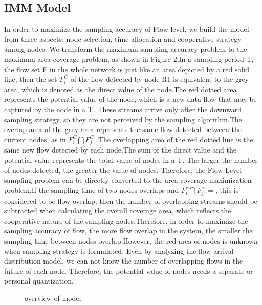 \documentclass[conference,compsoc]{IEEEtran}
\begin{document}
\subsection{IMM  Model}
In order to maximize the sampling accuracy of Flow-level, we build the model from three aspects: node selection, time allocation and cooperative strategy among nodes. We transform the maximum sampling accuracy problem to the maximum area coverage problem, as shown in Figure 2.In a sampling period T, the flow set F in the whole network is just like an area depicted by a red solid line, then the set $F_i^ C$ of the flow detected by node R1 is equivalent to the grey area, which is denoted as the direct value of the node.The red dotted area represents the potential value of the node, which is a new data flow that may be captured by the node in a T. These streams arrive only after the downward sampling strategy, so they are not perceived by the sampling algorithm.The overlap area of the grey area represents the same flow detected between the current nodes, as in $F_i ^ C \bigcap F_j ^ C$. The overlapping area of the red dotted line is the same new flow detected by each node.The sum of the direct value and the potential value represents the total value of nodes in a T. The larger the number of nodes detected, the greater the value of nodes. Therefore, the Flow-Level sampling problem can be directly converted to the area coverage maximization problem.If the sampling time of two nodes overlaps and $F^c_i \bigcap F^c_j!={}$, this is considered to be flow overlap, then the number of overlapping streams should be subtracted when calculating the overall coverage area, which reflects the cooperative nature of the sampling nodes.Therefore, in order to maximize the sampling accuracy of flow, the more flow overlap in the system, the smaller the sampling time between nodes overlap.However, the red area of nodes is unknown when sampling strategy is formulated. Even by analyzing the flow arrival distribution model, we can not know the number of overlapping flows in the future of each node. Therefore, the potential value of nodes needs a separate or personal quantization.
\begin{figure}[!!!!!!!!!!!!!!hhhhhhhhhht]
\centering
{}
\caption{overview of model}
\label{fig_1_model}
\end{figure}
\end{document}
